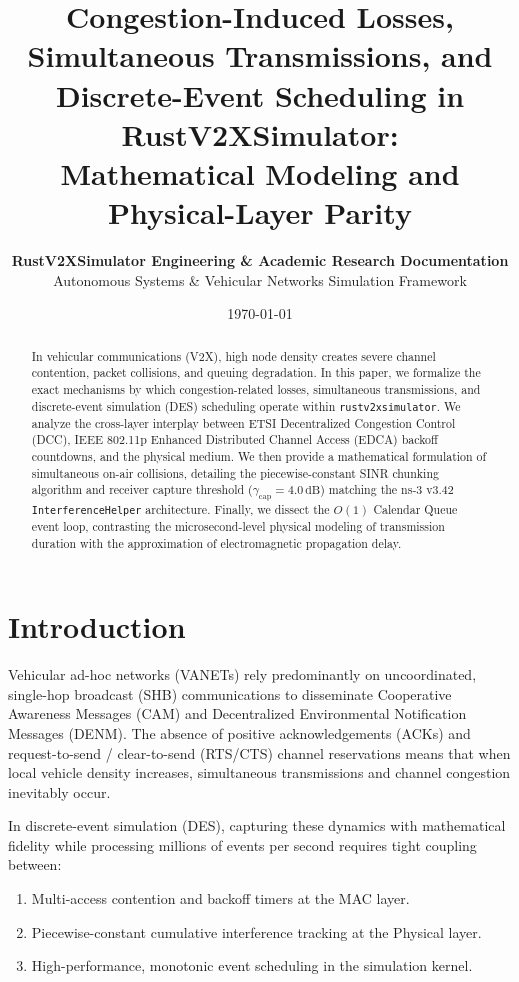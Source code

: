 \documentclass[11pt,a4paper]{article}
\title{\textbf{Congestion-Induced Losses, Simultaneous Transmissions, and Discrete-Event Scheduling in RustV2XSimulator:\\
Mathematical Modeling and Physical-Layer Parity}}
\author{
    \textbf{RustV2XSimulator Engineering \& Academic Research Documentation} \\
    Autonomous Systems \& Vehicular Networks Simulation Framework
}
\date{\today}
\begin{document}
\maketitle

\begin{abstract}
In vehicular communications (V2X), high node density creates severe channel contention, packet collisions, and queuing degradation. In this paper, we formalize the exact mechanisms by which congestion-related losses, simultaneous transmissions, and discrete-event simulation (DES) scheduling operate within \texttt{rustv2xsimulator}. We analyze the cross-layer interplay between ETSI Decentralized Congestion Control (DCC), IEEE 802.11p Enhanced Distributed Channel Access (EDCA) backoff countdowns, and the physical medium. We then provide a mathematical formulation of simultaneous on-air collisions, detailing the piecewise-constant SINR chunking algorithm and receiver capture threshold ($\gamma_{\mathrm{cap}} = 4.0\,\mathrm{dB}$) matching the ns-3 v3.42 \texttt{InterferenceHelper} architecture. Finally, we dissect the $O(1)$ Calendar Queue event loop, contrasting the microsecond-level physical modeling of transmission duration with the approximation of electromagnetic propagation delay.
\end{abstract}

\section{Introduction}
Vehicular ad-hoc networks (VANETs) rely predominantly on uncoordinated, single-hop broadcast (SHB) communications to disseminate Cooperative Awareness Messages (CAM) and Decentralized Environmental Notification Messages (DENM). The absence of positive acknowledgements (ACKs) and request-to-send / clear-to-send (RTS/CTS) channel reservations means that when local vehicle density increases, simultaneous transmissions and channel congestion inevitably occur.

In discrete-event simulation (DES), capturing these dynamics with mathematical fidelity while processing millions of events per second requires tight coupling between:
\begin{enumerate}[noitemsep]
    \item Multi-access contention and backoff timers at the MAC layer.
    \item Piecewise-constant cumulative interference tracking at the Physical layer.
    \item High-performance, monotonic event scheduling in the simulation kernel.
\end{enumerate}
\end{document}
